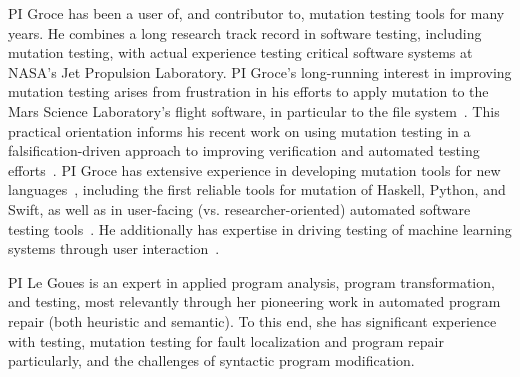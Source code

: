 PI Groce has been a user of, and contributor to, mutation testing tools for many years.  He combines a long research track record in software testing, including mutation testing, with actual experience testing critical software systems at NASA's Jet Propulsion Laboratory.  PI Groce's long-running interest in improving mutation testing arises from frustration in his efforts to apply mutation to the  Mars Science Laboratory's flight software, in particular to the file system~\cite{ICSEDiff,CFV08,AMAI}.  This practical orientation informs his recent work on using mutation testing in a falsification-driven approach to improving verification and automated testing efforts~\cite{groce2015verified,groce2018verified,mutKernel}.  PI Groce has extensive experience in developing mutation tools for new languages~\cite{le2014mucheck,muupi,regexpMut}, including the first reliable tools for mutation of Haskell, Python, and Swift, as well as in user-facing (vs. researcher-oriented) automated software testing tools~\cite{tstlsttt,DeepState}.  He additionally has expertise in driving testing of machine learning systems through user interaction~\cite{EndUserMistake,OnlyOracle}.

PI Le Goues is an expert in applied program analysis, program transformation,
and testing, most relevantly through her pioneering work in automated program
repair (both heuristic and semantic).  To this end, she has significant
experience with testing, mutation testing for fault localization and program
repair particularly, and the challenges of syntactic program modification. 
